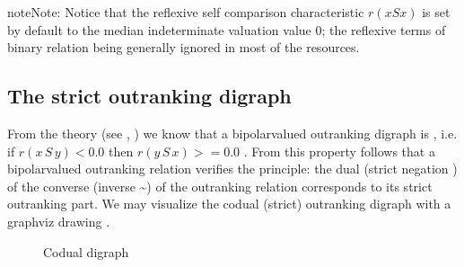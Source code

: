 \documentclass[a4paper,12pt,english]{sphinxhowto}
\let\sphinxpxdimen\pdfpxdimen\else\newdimen\sphinxpxdimen
\begin{document}
\begin{sphinxadmonition}{note}{Note:}
Notice that the reflexive self comparison characteristic \(r(x S x)\) is set by default to the median indeterminate valuation value 0; the reflexive terms of binary relation being generally ignored in most of the  resources.
\end{sphinxadmonition}


\subsection{The strict outranking digraph}
\label{\detokenize{tutorial:the-strict-outranking-digraph}}\label{\detokenize{tutorial:codual-digraph-label}}
From the theory (see ,  )  we know that a bipolar\sphinxhyphen{}valued outranking digraph is , i.e. if \(r(x\,S\,y) < 0.0\) then \(r(y\,S\,x) >= 0.0\) . From this property follows that a bipolar\sphinxhyphen{}valued outranking relation verifies the  principle: the dual (strict negation \sphinxhyphen{} \sphinxfootnotemark[14]) of the converse (inverse \textasciitilde{}) of the outranking relation corresponds to its strict outranking part. We may visualize the codual (strict) outranking digraph with a graphviz drawing \sphinxfootnotemark[1].

\begin{sphinxVerbatim}[commandchars=\\\{\},numbers=left,firstnumber=1,stepnumber=1]
  
\end{sphinxVerbatim}

\begin{figure}[H]
\centering
\capstart

\noindent\sphinxincludegraphics[width=300\sphinxpxdimen]{{codualOdg}.png}
\caption{Codual digraph}\label{\detokenize{tutorial:id185}}\end{figure}
\end{document}

